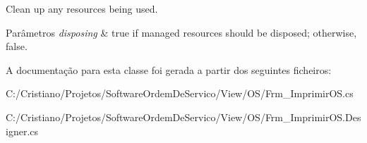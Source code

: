 Clean up any resources being used. 


\begin{DoxyParams}{Parâmetros}
{\em disposing} & true if managed resources should be disposed; otherwise, false.\\
\hline
\end{DoxyParams}


A documentação para esta classe foi gerada a partir dos seguintes ficheiros\+:\begin{DoxyCompactItemize}
\item 
C\+:/\+Cristiano/\+Projetos/\+Software\+Ordem\+De\+Servico/\+View/\+O\+S/Frm\+\_\+\+Imprimir\+O\+S.\+cs\item 
C\+:/\+Cristiano/\+Projetos/\+Software\+Ordem\+De\+Servico/\+View/\+O\+S/Frm\+\_\+\+Imprimir\+O\+S.\+Designer.\+cs\end{DoxyCompactItemize}
